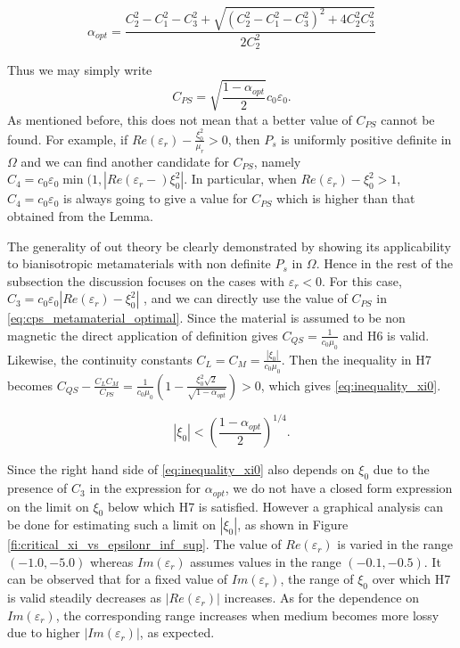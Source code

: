 \begin{equation}  \label{eq:alpha_opt}
\alpha_{opt} = \frac{C_2^2-C_1^2-C_3^2 + \sqrt{(C_2^2-C_1^2-C_3^2)^2+4C_2^2C_3^2}}{2C_2^2}
\end{equation}

Thus we may simply write 
\begin{equation} \label{eq:cps_metamaterial_optimal}
C_{PS} = \sqrt{\frac{1-\alpha_{opt}}{2}}c_0\varepsilon_0.
\end{equation}
As mentioned before, this does not mean that a better value of $C_{PS}$ 
cannot be found.
For example, if $Re(\varepsilon_r) -\frac{\xi_0^2}{\mu_r} > 0$, 
then $P_s$ is uniformly positive definite in $\Omega$ and we can find 
another candidate for $C_{PS}$, namely $C_4 = c_0\varepsilon_0\min(1, |Re(\varepsilon_r-)\xi_0^2|$.
In particular, when  $Re(\varepsilon_r) - \xi_0^2 > 1$, $C_4 = c_0\varepsilon_0$ is always going to give a value for $C_{PS}$ which is higher than that obtained from the Lemma.

The generality of out theory be clearly demonstrated by showing its 
applicability to bianisotropic metamaterials with non definite $P_s$ in $\Omega$. 
Hence in the rest of the subsection the discussion  focuses on 
the cases with $\varepsilon_r < 0$.
For this case,$C_3 = c_0\varepsilon_0 |Re(\varepsilon_r) -\xi_0^2|$ , and we can directly use the value of $C_{PS}$ in \eqref{eq:cps_metamaterial_optimal}.
Since the material is assumed to be non magnetic the direct application of definition 
gives $C_{QS} = \frac{1}{c_0\mu_0}$ and H6 is valid.
Likewise, the continuity constants $C_L = C_M = \frac{|\xi_0|}{c_0\mu_0}$.
Then the inequality in H7 becomes $C_{QS} -\frac{C_L C_M}{C_{PS}} = \frac{1}{c_0\mu_0}(1 -\frac{\xi_0^2\sqrt{2}}{\sqrt{1-\alpha_{opt}}}) > 0$, 
which gives \eqref{eq:inequality_xi0}.

\begin{equation} \label{eq:inequality_xi0}
|\xi_0| < \left(\frac{1 - \alpha_{opt}}{2}\right)^{1/4}.
\end{equation}

Since the right hand side of \eqref{eq:inequality_xi0} also depends on 
$\xi_0$ due to the presence of $C_3$ in the expression for $\alpha_{opt}$,
we do not have a closed form expression on the limit on $\xi_0$ 
below which H7 is satisfied.
However a graphical analysis can be done for estimating such a limit 
on $|\xi_0|$, as shown in 
Figure \ref{fi:critical_xi_vs_epsilonr_inf_sup}.
The value of $Re(\varepsilon_r)$ is varied in the range $(-1.0,-5.0)$ 
whereas $Im(\varepsilon_r)$ assumes values in the range $(-0.1,-0.5)$.
It can be observed that for a fixed value of $Im(\varepsilon_r)$, 
the range of $\xi_0$ over which H7 is valid steadily decreases as 
$|Re(\varepsilon_r)|$ increases. 
As for the dependence on $Im(\varepsilon_r)$, the corresponding range
increases when medium becomes more lossy due to higher $|Im(\varepsilon_r)|$,
as expected.

